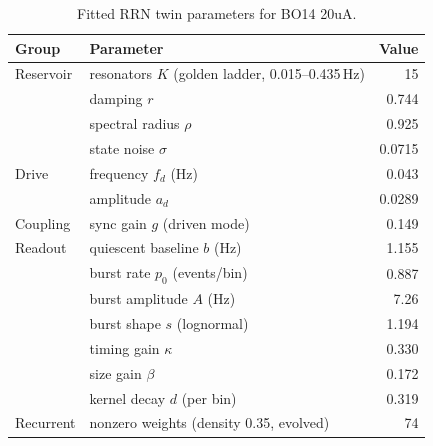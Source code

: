 \begin{table}[t]
  \centering
  \caption{Fitted RRN twin parameters for BO14 20uA.}
  \label{tab:rrn-params}
  \begin{tabular}{llr}
    \toprule
    Group & Parameter & Value \\
    \midrule
    Reservoir & resonators $K$ (golden ladder, 0.015--0.435\,Hz) & 15 \\
     & damping $r$ & 0.744 \\
     & spectral radius $\rho$ & 0.925 \\
     & state noise $\sigma$ & 0.0715 \\
    Drive & frequency $f_{d}$ (Hz) & 0.043 \\
     & amplitude $a_{d}$ & 0.0289 \\
    Coupling & sync gain $g$ (driven mode) & 0.149 \\
    Readout & quiescent baseline $b$ (Hz) & 1.155 \\
     & burst rate $p_{0}$ (events/bin) & 0.887 \\
     & burst amplitude $A$ (Hz) & 7.26 \\
     & burst shape $s$ (lognormal) & 1.194 \\
     & timing gain $\kappa$ & 0.330 \\
     & size gain $\beta$ & 0.172 \\
     & kernel decay $d$ (per bin) & 0.319 \\
    Recurrent & nonzero weights (density 0.35, evolved) & 74 \\
    \bottomrule
  \end{tabular}
\end{table}
